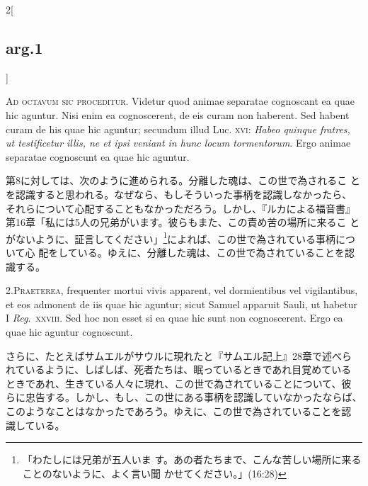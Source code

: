 \documentclass[paper=a4paper,fontsize=10pt,jafontsize=9pt,titlepage]{jlreq}
\begin{document}
\begin{paracol}{2}[\subsection{arg.1}]

{\huge A}{\scshape d octavum sic proceditur}. Videtur quod animae separatae
cognoscant ea quae hic aguntur. Nisi enim ea cognoscerent, de eis
curam non haberent. Sed habent curam de his quae hic aguntur; secundum
illud Luc. {\scshape xvi}: {\itshape Habeo quinque fratres, ut testificetur
illis, ne et ipsi veniant in hunc locum tormentorum}. Ergo animae
separatae cognoscunt ea quae hic aguntur.

\switchcolumn

第8に対しては、次のように進められる。分離した魂は、この世で為されるこ
とを認識すると思われる。なぜなら、もしそういった事柄を認識しなかったら、
それらについて心配することもなかっただろう。しかし、『ルカによる福音書』
第16章「私には5人の兄弟がいます。彼らもまた、この責め苦の場所に来るこ
とがないように、証言してください」\footnote{「わたしには兄弟が五人いま
す。あの者たちまで、こんな苦しい場所に来ることのないように、よく言い聞
かせてください。」(16:28)}によれば、この世で為されている事柄について心
配をしている。ゆえに、分離した魂は、この世で為されていることを認識する。


2.{\scshape Praeterea}, frequenter mortui vivis apparent, vel dormientibus
vel vigilantibus, et eos admonent de iis quae hic aguntur; sicut
Samuel apparuit Sauli, ut habetur I {\itshape Reg}.~{\scshape xxviii}. Sed hoc
non esset si ea quae hic sunt non cognoscerent. Ergo ea quae hic
aguntur cognoscunt.

\switchcolumn

さらに、たとえばサムエルがサウルに現れたと『サムエル記上』28章で述べら
れているように、しばしば、死者たちは、眠っているときであれ目覚めている
ときであれ、生きている人々に現れ、この世で為されていることについて、彼
らに忠告する。しかし、もし、この世にある事柄を認識していなかったならば、
このようなことはなかったであろう。ゆえに、この世で為されていることを認
識している。



\end{paracol}
\end{document}
